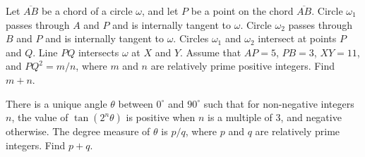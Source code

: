 \documentclass[11pt]{article}
\theoremstyle{definition}
\begin{document}
%	











\begin{question}[name={2019 AIME I, \href{https://artofproblemsolving.com/community/c4p11972613}{Problem 15}}]
	Let $\overline{AB}$ be a chord of a circle $\omega$, and let $P$ be a point on the chord $\overline{AB}$. Circle $\omega_1$ passes through $A$ and $P$ and is internally tangent to $\omega$. Circle $\omega_2$ passes through $B$ and $P$ and is internally tangent to $\omega$. Circles $\omega_1$ and $\omega_2$ intersect at points $P$ and $Q$. Line $PQ$ intersects $\omega$ at $X$ and $Y$. Assume that $AP=5$, $PB=3$, $XY=11$, and $PQ^2 = {m}/{n}$, where $m$ and $n$ are relatively prime positive integers. Find $m+n$.
\end{question}


%	
















\begin{question}[name={2019 AIME II, \href{https://artofproblemsolving.com/community/c4p12030042}{Problem 10}}]
	There is a unique angle $\theta$ between $0^{\circ}$ and $90^{\circ}$ such that for non-negative integers $n$, the value of $\tan{\left(2^{n}\theta\right)}$ is positive when $n$ is a multiple of $3$, and negative otherwise. The degree measure of $\theta$ is ${p}/{q}$, where $p$ and $q$ are relatively prime integers. Find $p+q$.
\end{question}


%	
\end{document}
